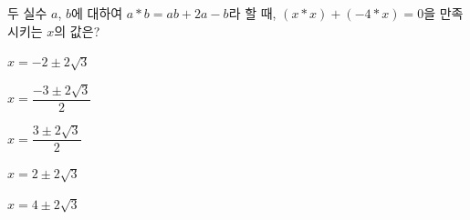 두 실수 $a$, $b$에 대하여 $a*b=ab+2a-b$라 할 때, $(x*x)+(-4*x)=0$을 만족시키는 $x$의 값은?
\begin{choicesii}{\rule[-3ex]{0pt}{8ex}$x=-2\pm2\sqrt{3}$}{\rule[-3ex]{0pt}{8ex}$x=\dfrac{-3\pm2\sqrt{3}}{2}$}{\rule[-3ex]{0pt}{8ex}$x=\dfrac{3\pm2\sqrt{3}}{2}$}{\rule[-3ex]{0pt}{8ex}$x=2\pm2\sqrt{3}$}{\rule[-3ex]{0pt}{8ex}$x=4\pm2\sqrt{3}$}\end{choicesii}
